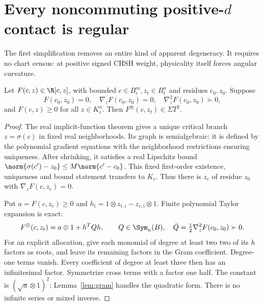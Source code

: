 \section{Every noncommuting positive-$d$ contact is regular}\label{sec:regular}
The first simplification removes an entire kind of apparent degeneracy. It requires no chart census: at positive signed CHSH weight, physicality itself forces angular curvature.

\begin{lemma}\label{lem:regular}
Let $F(c,z)\in\R[c,z]$, with bounded $c\in B_c^m,z_t\in B_t^n$ and residues $c_0,z_0$. Suppose
\[
F(c_0,z_0)=0,\quad \nabla_zF(c_0,z_0)=0,\quad
\nabla_z^2F(c_0,z_0)\succ0,
\]
and $F(c,z)\ge0$ for all $z\in K_c^n$. Then $F^\otimes(c,z_t)\in\Sigma T^2$.
\end{lemma}
\begin{proof}
The real implicit-function theorem gives a unique critical branch $z=\sigma(c)$ in fixed real neighborhoods. Its graph is semialgebraic: it is defined by the polynomial gradient equations with the neighborhood restrictions ensuring uniqueness. After shrinking, it satisfies a real Lipschitz bound $\norm{\sigma(c')-z_0}\le M\norm{c'-c_0}$. This fixed first-order existence, uniqueness and bound statement transfers to $K_c$. Thus there is $z_c$ of residue $z_0$ with $\nabla_zF(c,z_c)=0$.

Put $a=F(c,z_c)\ge0$ and $h_i=1\otimes z_{t,i}-z_{c,i}\otimes1$. Finite polynomial Taylor expansion is exact:
\[
F^\otimes(c,z_t)=a\otimes1+h^TQh,\qquad
Q\in\Sym_n(B),\quad\bar Q=\tfrac12\nabla_z^2F(c_0,z_0)\succ0.
\]
For an explicit allocation, give each monomial of degree at least two two of its $h$ factors as roots, and leave its remaining factors in the Gram coefficient. Degree-one terms vanish. Every coefficient of degree at least three then has an infinitesimal factor. Symmetrize cross terms with a factor one half. The constant is $(\sqrt a\otimes1)^2$; Lemma~\ref{lem:gram} handles the quadratic form. There is no infinite series or mixed inverse.
\end{proof}

